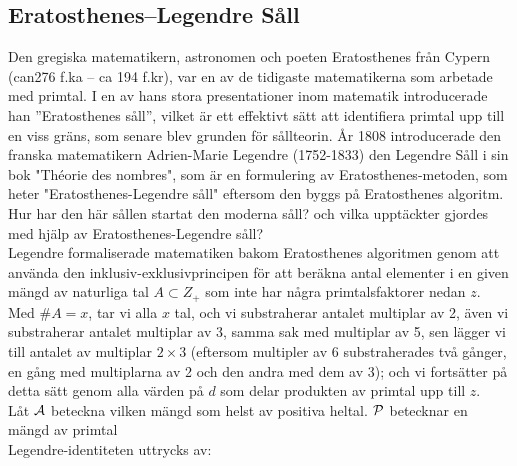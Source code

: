 


















\subsection{Eratosthenes–Legendre Såll}
\hspace{0.3cm} Den gregiska matematikern, astronomen och poeten Eratosthenes från Cypern (can276 f.ka – ca 194 f.kr), var en av de tidigaste matematikerna som arbetade med primtal. I en av hans stora presentationer inom matematik introducerade han ”Eratosthenes såll”, vilket är ett effektivt sätt att identifiera primtal upp till en viss gräns, som senare blev grunden för sållteorin.
År 1808 introducerade den franska matematikern Adrien-Marie Legendre (1752-1833) den Legendre Såll i sin bok "Théorie des nombres", som är en formulering av Eratosthenes-metoden, som heter "Eratosthenes-Legendre såll" eftersom den byggs på Eratosthenes algoritm.\\


 Hur har den här sållen startat den moderna såll? och vilka upptäckter gjordes med hjälp av Eratosthenes-Legendre såll?\\



 Legendre formaliserade matematiken bakom Eratosthenes algoritmen genom att använda den inklusiv-exklusivprincipen för att beräkna antal elementer i en given mängd av naturliga tal  $ A\subset Z_{+} $ som inte har några primtalsfaktorer nedan $ z $. Med $  \#A=x $, tar vi alla $ x $ tal, och vi substraherar antalet multiplar av 2, även vi substraherar antalet multiplar av 3, samma sak med multiplar av 5, sen lägger vi till antalet av multiplar $ 2\times3 $ (eftersom multipler av 6 substraherades två gånger, en gång med multiplarna av 2 och den andra med dem av 3); och vi fortsätter på detta sätt genom alla värden på  $ d $ som delar produkten av primtal upp till  $ z $. \\
 
Låt $ \A $ beteckna vilken mängd som helst av positiva heltal. $ \P $ betecknar en mängd av primtal\\

Legendre-identiteten uttrycks av: 

